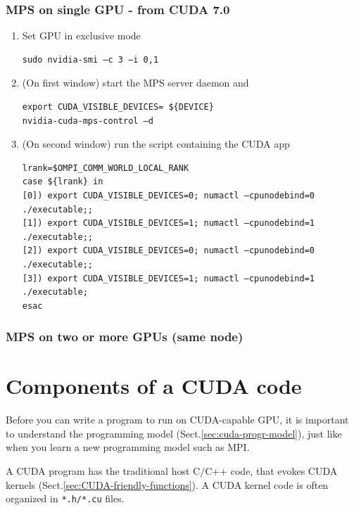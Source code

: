 \subsection{MPS on single GPU - from CUDA 7.0}

\begin{enumerate}
  \item Set GPU in exclusive mode
  
\begin{verbatim}
sudo nvidia-smi –c 3 –i 0,1 
\end{verbatim}

  \item (On first window) start the MPS server daemon and 
\begin{verbatim}
export CUDA_VISIBLE_DEVICES= ${DEVICE}
nvidia-cuda-mps-control –d
\end{verbatim}

   \item (On second window) run the script containing the CUDA app
   
\begin{verbatim}
lrank=$OMPI_COMM_WORLD_LOCAL_RANK
case ${lrank} in
[0]) export CUDA_VISIBLE_DEVICES=0; numactl —cpunodebind=0 ./executable;;
[1]) export CUDA_VISIBLE_DEVICES=1; numactl —cpunodebind=1 ./executable;;
[2]) export CUDA_VISIBLE_DEVICES=0; numactl —cpunodebind=0 ./executable;;
[3]) export CUDA_VISIBLE_DEVICES=1; numactl —cpunodebind=1 ./executable;
esac
\end{verbatim}



\end{enumerate}

\subsection{MPS on two or more GPUs (same node)}



\chapter{Components of a CUDA code}
\label{sec:cuda-code}

Before you can write a program to run on CUDA-capable GPU, it is important to
understand the programming model (Sect.\ref{sec:cuda-progr-model}), just like
when you learn a new programming model such as MPI.

A CUDA program has the traditional host C/C++ code, that evokes CUDA kernels
(Sect.\ref{sec:CUDA-friendly-functions}). A CUDA kernel code is often organized
in \verb!*.h/*.cu! files.

